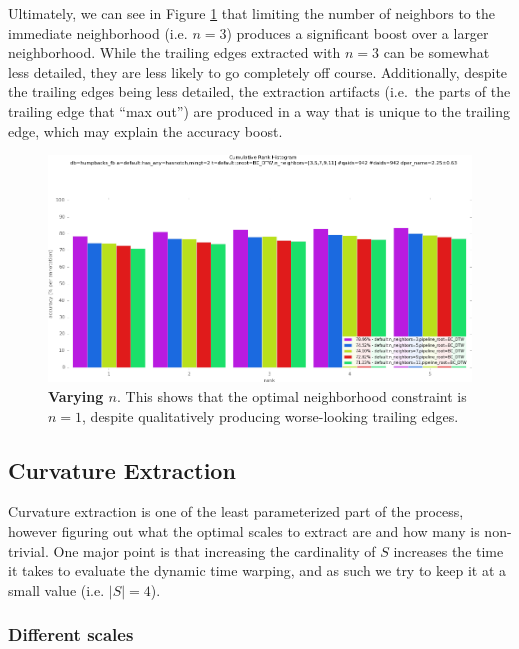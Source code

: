 Ultimately, we can see in Figure \ref{fig:vary_neighbors} that limiting the number of neighbors to the immediate neighborhood (i.e. $n = 3$) produces a significant boost over a larger neighborhood.
While the trailing edges extracted with $n = 3$ can be somewhat less detailed, they are less likely to go completely off course.
Additionally, despite the trailing edges being less detailed, the extraction artifacts (i.e.\ the parts of the trailing edge that ``max out'') are produced in a way that is unique to the trailing edge, which may explain the accuracy boost.

\begin{figure}[t]%
\centering
\includegraphics[width=1\textwidth]{../images/results/vary_neighbors.png}
\caption[]{\textbf{Varying $n$}. This shows that the optimal neighborhood constraint is $n = 1$, despite qualitatively producing worse-looking trailing edges.}
\label{fig:vary_neighbors}
\end{figure}



\subsection{Curvature Extraction}

Curvature extraction is one of the least parameterized part of the process, however figuring out what the optimal scales to extract are and how many is non-trivial.
One major point is that increasing the cardinality of $S$ increases the time it takes to evaluate the dynamic time warping, and as such we try to keep it at a small value (i.e. $|S| = 4$).

\subsubsection{Different scales}

